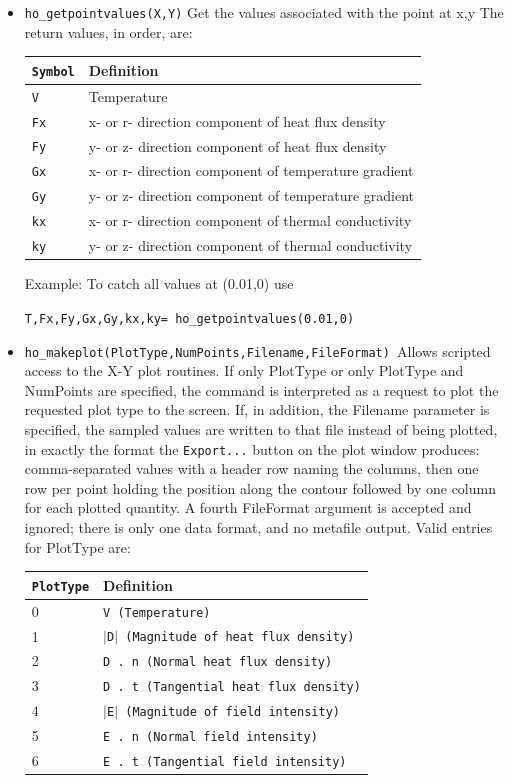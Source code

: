 \begin{itemize}
\item \texttt{ho\_getpointvalues(X,Y)} Get the values associated with the point at x,y
The return values, in order, are:

\begin{tabular}{ll}
\texttt{Symbol} &  Definition \\ \hline
\texttt{V} & Temperature \\
\texttt{Fx} & x- or r- direction component of heat flux density \\
\texttt{Fy} & y- or z- direction component of heat flux density \\
\texttt{Gx} & x- or r- direction component of temperature gradient \\
\texttt{Gy} & y- or z- direction component of temperature gradient \\
\texttt{kx} & x- or r- direction component of thermal conductivity \\
\texttt{ky} & y- or z- direction component of thermal conductivity \\
\end{tabular}

Example: To catch all values at (0.01,0) use

\texttt{T,Fx,Fy,Gx,Gy,kx,ky= ho\_getpointvalues(0.01,0) }

\item \texttt{ho\_makeplot(PlotType,NumPoints,Filename,FileFormat) }Allows scripted access
to the X-Y plot routines. If only PlotType or only PlotType and NumPoints
are specified, the command is interpreted as a request to plot the requested
plot type to the screen. If, in addition, the Filename parameter is
specified, the sampled values are written to that file instead of being
plotted, in exactly the format the \texttt{Export...} button on the plot
window produces: comma-separated values with a header row naming the columns,
then one row per point holding the position along the contour followed by one
column for each plotted quantity. A fourth FileFormat argument is accepted and
ignored; there is only one data format, and no metafile output. Valid entries
for PlotType are:

\begin{tabular}{ll}
\texttt{PlotType} &  Definition \\ \hline
 0 & \texttt{V (Temperature)} \\
 1 & \texttt{$\vert$D$\vert$ (Magnitude of heat flux density)} \\
 2 & \texttt{D . n (Normal heat flux density)} \\
 3 & \texttt{D . t (Tangential heat flux density)} \\
 4 & \texttt{$\vert$E$\vert$ (Magnitude of field intensity)} \\
 5 & \texttt{E . n (Normal field intensity)} \\
 6 & \texttt{E . t (Tangential field intensity)}
\end{tabular}



\end{itemize}
